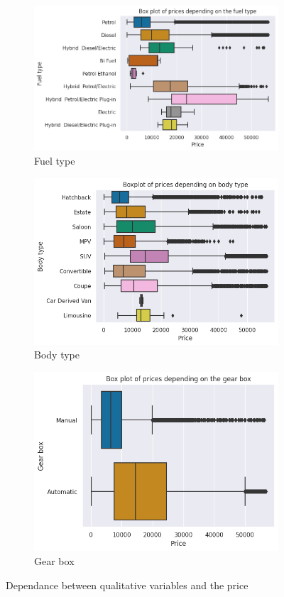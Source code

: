 \documentclass[12pt]{article}
\begin{document}
\begin{figure}[ht]
  \centering
  \begin{subfigure}{0.36\textwidth}
    \includegraphics[width=\linewidth]{fuel type.png}
    \caption{Fuel type}
  \end{subfigure}
  \hfill
  \begin{subfigure}{0.32\textwidth}
    \includegraphics[width=\linewidth]{body type.png}
    \caption{Body type}
  \end{subfigure}
  \hfill
  \begin{subfigure}{0.30\textwidth}
    \includegraphics[width=\linewidth]{gear box.png}
    \caption{Gear box}
  \end{subfigure}
  \caption{Dependance between qualitative variables and the price}
  \label{Three boxplots}
\end{figure}
\end{document}
